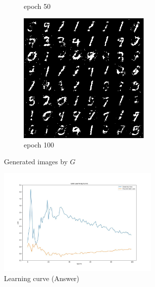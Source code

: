 \documentclass[a4paper]{article}
\theoremstyle{definition}
\newenvironment{soln}{
	\leavevmode\color{blue}\ignorespaces
}{}
\begin{document}
\begin{enumerate} [label=(\alph*)]
\begin{figure}[H]
\begin{subfigure}[b]{0.3\textwidth}
				\caption{epoch 50}
			\end{subfigure}
			\hfill
			\begin{subfigure}[b]{0.3\textwidth}
				\centering
				\includegraphics[width=\textwidth]{gan_q1_epoch100.png}
				\caption{epoch 100}
			\end{subfigure}
			\caption{Generated images by $G$}
			\label{fig:three graphs}
		\end{figure}
		
		
		\begin{soln}
			\begin{figure}[H]
				\centering
				\includegraphics[width=0.7\textwidth]{../outputs-a200/loss-100.jpg}
				\caption{Learning curve (Answer)}
				\label{fig:gan_q1_loss_submission}
			\end{figure}
			

\end{soln}
\end{enumerate}
\end{document}
